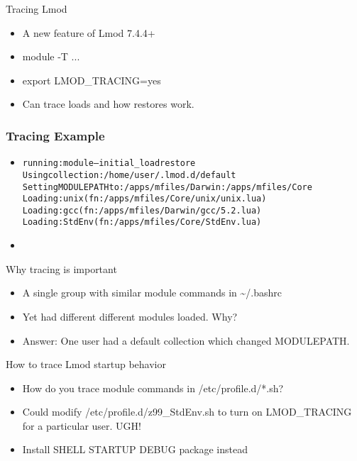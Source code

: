 \documentclass[dvipsnames,aspectratio=169]{beamer}
\begin{document}
\begin{frame}{Tracing Lmod}
  \begin{itemize}
    \item A new feature of Lmod 7.4.4+
    \item module -T ...
    \item export LMOD\_TRACING=yes
    \item Can trace loads and how restores work.
  \end{itemize}
\end{frame}

\begin{frame}[fragile]
    \frametitle{Tracing Example}
  \begin{itemize}
    \item 
  {\small
    \begin{alltt}
running: module --initial_load restore
  Using collection:      /home/user/.lmod.d/default
  Setting MODULEPATH to: /apps/mfiles/Darwin:/apps/mfiles/Core
  Loading: unix (fn: /apps/mfiles/Core/unix/unix.lua)
  Loading: gcc (fn: /apps/mfiles/Darwin/gcc/5.2.lua)
  Loading: StdEnv (fn: /apps/mfiles/Core/StdEnv.lua)
    \end{alltt}
}
    \item 
  \end{itemize}
\end{frame}


\begin{frame}{Why tracing is important}
  \begin{itemize}
    \item A single group with similar module commands in \textasciitilde/.bashrc
    \item Yet had different different modules loaded. Why?
    \item Answer: One user had a default collection which changed MODULEPATH.
  \end{itemize}
\end{frame}

\begin{frame}{How to trace Lmod startup behavior}
  \begin{itemize}
    \item How do you trace module commands in /etc/profile.d/*.sh?
    \item Could modify /etc/profile.d/z99\_StdEnv.sh to turn on
      LMOD\_TRACING for a particular user. UGH!
    \item Install SHELL STARTUP DEBUG package instead
  \end{itemize}
\end{frame}
\end{document}
